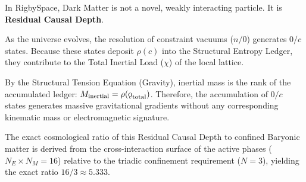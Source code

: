 \documentclass[11pt, letterpaper]{article}
\newcommand{\koppa}{\mathbin{\text{\rm\k{o}}}}
\newcommand{\rank}{\rho}
\begin{document}
\begin{theorem}\label{thm:dark_matter}
\begin{rsbox}
In RigbySpace, Dark Matter is not a novel, weakly interacting particle. It is \textbf{Residual Causal Depth}.

As the universe evolves, the resolution of constraint vacuums ($n/0$) generates $0/c$ states. Because these states deposit $\rank(c)$ into the Structural Entropy Ledger, they contribute to the Total Inertial Load ($\chi$) of the local lattice. 

By the Structural Tension Equation (Gravity), inertial mass is the rank of the accumulated ledger: $M_{\text{inertial}} = \rho(\koppa_{\text{total}})$. Therefore, the accumulation of $0/c$ states generates massive gravitational gradients without any corresponding kinematic mass or electromagnetic signature. 

The exact cosmological ratio of this Residual Causal Depth to confined Baryonic matter is derived from the cross-interaction surface of the active phases ($N_E \times N_M = 16$) relative to the triadic confinement requirement ($N=3$), yielding the exact ratio $16/3 \approx 5.333$.
\end{rsbox}
\end{theorem}
\end{document}

